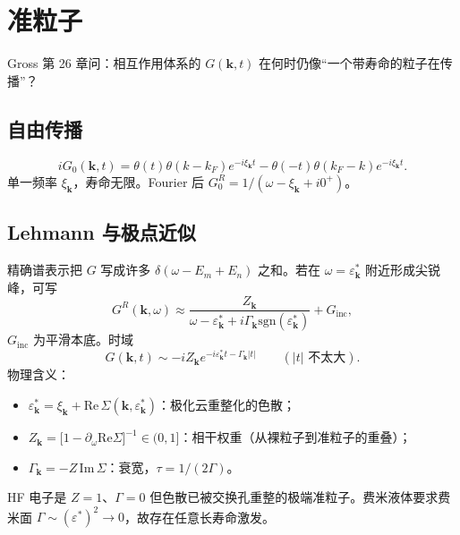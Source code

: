 \section{准粒子}

Gross 第 26 章问：相互作用体系的 $G(\mathbf{k},t)$ 在何时仍像“一个带寿命的粒子在传播”？

\subsection{自由传播}

\begin{equation}
  iG_0(\mathbf{k},t)
  =\theta(t)\theta(k-k_F)e^{-i\xi_{\mathbf{k}}t}
  -\theta(-t)\theta(k_F-k)e^{-i\xi_{\mathbf{k}}t}.
\end{equation}
单一频率 $\xi_{\mathbf{k}}$，寿命无限。Fourier 后 $G_0^R=1/(\omega-\xi_{\mathbf{k}}+i0^+)$。

\subsection{Lehmann 与极点近似}

精确谱表示把 $G$ 写成许多 $\delta(\omega-E_m+E_n)$ 之和。若在 $\omega=\varepsilon_{\mathbf{k}}^*$ 附近形成尖锐峰，可写
\begin{equation}
  G^R(\mathbf{k},\omega)
  \approx
  \frac{Z_{\mathbf{k}}}
  {\omega-\varepsilon_{\mathbf{k}}^*+i\Gamma_{\mathbf{k}}\mathrm{sgn}(\varepsilon_{\mathbf{k}}^*)}
  +G_{\mathrm{inc}},
\label{eq:G_QP}
\end{equation}
$G_{\mathrm{inc}}$ 为平滑本底。时域
\begin{equation}
  G(\mathbf{k},t)
  \sim
  -i Z_{\mathbf{k}}
  e^{-i\varepsilon_{\mathbf{k}}^* t-\Gamma_{\mathbf{k}}|t|}
  \qquad(|t|\text{ 不太大}).
\end{equation}
物理含义：
\begin{itemize}
  \item $\varepsilon_{\mathbf{k}}^*=\xi_{\mathbf{k}}+\mathrm{Re}\,\Sigma(\mathbf{k},\varepsilon_{\mathbf{k}}^*)$：极化云重整化的色散；
  \item $Z_{\mathbf{k}}=\bigl[1-\partial_\omega\mathrm{Re}\Sigma\bigr]^{-1}\in(0,1]$：相干权重（从裸粒子到准粒子的重叠）；
  \item $\Gamma_{\mathbf{k}}=-Z\,\mathrm{Im}\,\Sigma$：衰宽，$\tau=1/(2\Gamma)$。
\end{itemize}
HF 电子是 $Z=1$、$\Gamma=0$ 但色散已被交换孔重整的极端准粒子。费米液体要求费米面 $\Gamma\sim(\varepsilon^*)^2\to0$，故存在任意长寿命激发。

